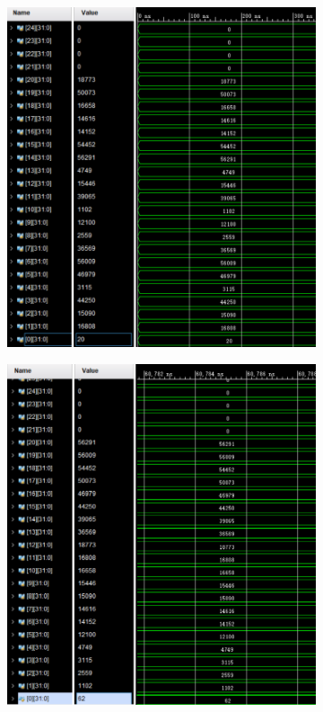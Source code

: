 \documentclass[a4paper]{article}  %
\begin{document}
\begin{figure}[ht]
    \centering
    \begin{subfigure}[b]{0.48\textwidth}
        \centering
        \includegraphics[width=\textwidth]{asserts/data_origin.png}
    \end{subfigure}
    \hfill
    \begin{subfigure}[b]{0.48\textwidth}
        \centering
        \includegraphics[width=\textwidth]{asserts/data_sort.png}

\end{subfigure}
\end{figure}
\end{document}
